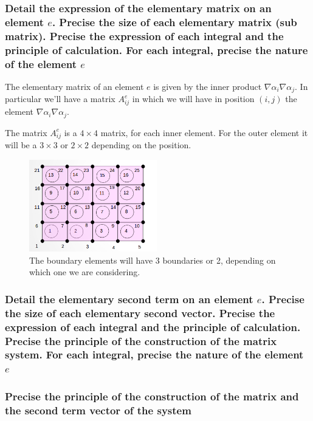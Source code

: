 \documentclass{article}
\begin{document}
\subsubsection{Detail the expression of the elementary matrix on an element $ e $. Precise the size of each elementary matrix (sub matrix). Precise the expression of each integral and the principle of calculation. For each integral, precise the nature of the element $ e $} 

The elementary matrix of an element $ e $ is given by the inner product $ \nabla\alpha_i\nabla\alpha_j $. In particular we'll have a matrix $ A_{ij}^e $ in which we will have in position $ (i,j) $ the element $ \nabla\alpha_i\nabla\alpha_j $. 


The matrix $ A_{ij}^e $ is a $ 4\times4 $ matrix, for each inner element. For the outer element it will be a $ 3\times3 $ or $ 2\times2 $ depending on the position. 
\begin{figure}
	\centering
	\includegraphics[height=4cm]{Images/mesh.png}
	\caption{The boundary elements will have 3 boundaries or 2, depending on which one we are considering.}
\end{figure}

\subsubsection{Detail the elementary second term on an element $ e $. Precise the size of each elementary second vector. Precise the expression of each integral and the principle of calculation. Precise the principle of the construction of the matrix system. For each integral, precise the nature of the element $ e $} 

\subsubsection{Precise the principle of the construction of the matrix and the second term vector of the system}
\end{document}
